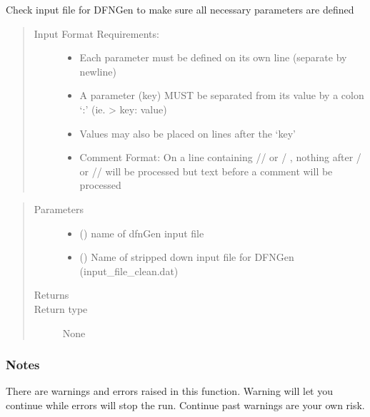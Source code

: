 \documentclass[letterpaper,10pt,english]{sphinxmanual}
\begin{document}
\begin{fulllineitems}
\label{\detokenize{pydfnworks:pydfnworks.dfnGen.gen_input.check_input}}
Check input file for DFNGen to make sure all necessary parameters are defined
\begin{quote}
\begin{description}
\item[{Input Format Requirements:}] \leavevmode\begin{itemize}
\item {} 
Each parameter must be defined on its own line (separate by newline)

\item {} 
A parameter (key) MUST be separated from its value by a colon ‘:’ (ie. \textendash{}\textgreater{} key: value)

\item {} 
Values may also be placed on lines after the ‘key’

\item {} 
Comment Format:  On a line containing  // or / \sphinxcode{\sphinxupquote{*}}, nothing after \sphinxcode{\sphinxupquote{*}} / or // will be processed  but text before a comment will be processed

\end{itemize}

\end{description}
\end{quote}
\begin{quote}\begin{description}
\item[{Parameters}] \leavevmode\begin{itemize}
\item {} 
 () \textendash{} name of dfnGen input file

\item {} 
 () \textendash{} Name of stripped down input file for DFNGen (input\_file\_clean.dat)

\end{itemize}

\item[{Returns}] \leavevmode


\item[{Return type}] \leavevmode
None

\end{description}\end{quote}
\subsubsection*{Notes}

There are warnings and errors raised in this function. Warning will let you continue while errors will stop the run. Continue past warnings are your own risk.

\end{fulllineitems}
\end{document}
